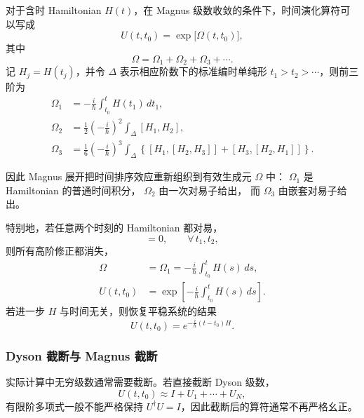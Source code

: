\documentclass[UTF8,a4paper,11pt,openany]{ctexbook}
\begin{document}
\begin{proposition}[Magnus 展开]
对于含时 Hamiltonian $H(t)$，在 Magnus 级数收敛的条件下，时间演化算符可以写成
\begin{equation}
    U(t,t_0)
    =
    \exp\bigl[\Omega(t,t_0)\bigr],
\end{equation}
其中
\begin{equation}
    \Omega
    =
    \Omega_1+\Omega_2+\Omega_3+\cdots.
\end{equation}
记 $H_j=H(t_j)$，并令 $\Delta$ 表示相应阶数下的标准编时单纯形
$t_1>t_2>\cdots$，则前三阶为
\begin{align}
    \Omega_1
    &=
    -\frac{i}{\hbar}
    \int_{t_0}^{t}H(t_1)\,dt_1,
    \nonumber\\
    \Omega_2
    &=
    \frac12
    \left(-\frac{i}{\hbar}\right)^2
    \int_{\Delta}
    [H_1,H_2],
    \nonumber\\
    \Omega_3
    &=
    \frac16
    \left(-\frac{i}{\hbar}\right)^3
    \int_{\Delta}
    \left\{
        [H_1,[H_2,H_3]]
        +
        [H_3,[H_2,H_1]]
    \right\}.
\end{align}

因此 Magnus 展开把时间排序效应重新组织到有效生成元 $\Omega$ 中：
$\Omega_1$ 是 Hamiltonian 的普通时间积分，
$\Omega_2$ 由一次对易子给出，
而 $\Omega_3$ 由嵌套对易子给出。
\end{proposition}

特别地，若任意两个时刻的 Hamiltonian 都对易，
\begin{equation}
    [H(t_1),H(t_2)]=0,
    \qquad
    \forall\,t_1,t_2,
\end{equation}
则所有高阶修正都消失，
\begin{align}
    \Omega
    &=\Omega_1
    =
    -\frac{i}{\hbar}
    \int_{t_0}^{t}H(s)\,ds,
    \nonumber\\
    U(t,t_0)
    &=
    \exp\left[
        -\frac{i}{\hbar}
        \int_{t_0}^{t}H(s)\,ds
    \right].
\end{align}
若进一步 $H$ 与时间无关，则恢复平稳系统的结果
\begin{equation}
    U(t,t_0)
    =
    e^{-\frac{i}{\hbar}(t-t_0)H}.
\end{equation}

\subsubsection*{Dyson 截断与 Magnus 截断}

实际计算中无穷级数通常需要截断。若直接截断 Dyson 级数，
\begin{equation}
    U(t,t_0)
    \approx
    I+U_1+\cdots+U_N,
\end{equation}
有限阶多项式一般不能严格保持
$U^\dagger U=I$，因此截断后的算符通常不再严格幺正。
\end{document}
